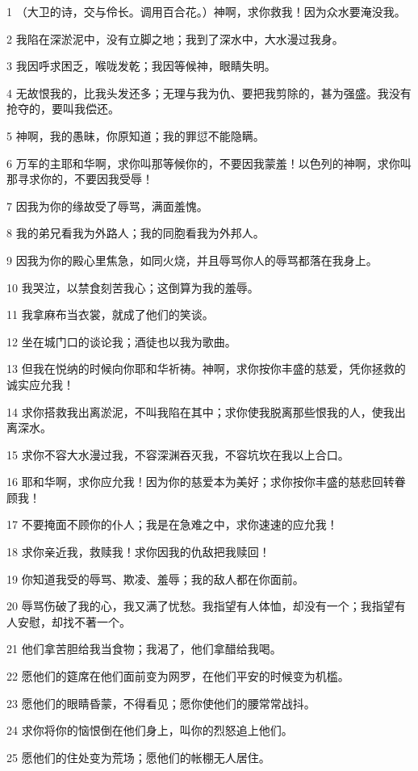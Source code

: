 \par 1 （大卫的诗，交与伶长。调用百合花。）神啊，求你救我！因为众水要淹没我。
\par 2 我陷在深淤泥中，没有立脚之地；我到了深水中，大水漫过我身。
\par 3 我因呼求困乏，喉咙发乾；我因等候神，眼睛失明。
\par 4 无故恨我的，比我头发还多；无理与我为仇、要把我剪除的，甚为强盛。我没有抢夺的，要叫我偿还。
\par 5 神啊，我的愚昧，你原知道；我的罪愆不能隐瞒。
\par 6 万军的主耶和华啊，求你叫那等候你的，不要因我蒙羞！以色列的神啊，求你叫那寻求你的，不要因我受辱！
\par 7 因我为你的缘故受了辱骂，满面羞愧。
\par 8 我的弟兄看我为外路人；我的同胞看我为外邦人。
\par 9 因我为你的殿心里焦急，如同火烧，并且辱骂你人的辱骂都落在我身上。
\par 10 我哭泣，以禁食刻苦我心；这倒算为我的羞辱。
\par 11 我拿麻布当衣裳，就成了他们的笑谈。
\par 12 坐在城门口的谈论我；酒徒也以我为歌曲。
\par 13 但我在悦纳的时候向你耶和华祈祷。神啊，求你按你丰盛的慈爱，凭你拯救的诚实应允我！
\par 14 求你搭救我出离淤泥，不叫我陷在其中；求你使我脱离那些恨我的人，使我出离深水。
\par 15 求你不容大水漫过我，不容深渊吞灭我，不容坑坎在我以上合口。
\par 16 耶和华啊，求你应允我！因为你的慈爱本为美好；求你按你丰盛的慈悲回转眷顾我！
\par 17 不要掩面不顾你的仆人；我是在急难之中，求你速速的应允我！
\par 18 求你亲近我，救赎我！求你因我的仇敌把我赎回！
\par 19 你知道我受的辱骂、欺凌、羞辱；我的敌人都在你面前。
\par 20 辱骂伤破了我的心，我又满了忧愁。我指望有人体恤，却没有一个；我指望有人安慰，却找不著一个。
\par 21 他们拿苦胆给我当食物；我渴了，他们拿醋给我喝。
\par 22 愿他们的筵席在他们面前变为网罗，在他们平安的时候变为机槛。
\par 23 愿他们的眼睛昏蒙，不得看见；愿你使他们的腰常常战抖。
\par 24 求你将你的恼恨倒在他们身上，叫你的烈怒追上他们。
\par 25 愿他们的住处变为荒场；愿他们的帐棚无人居住。
